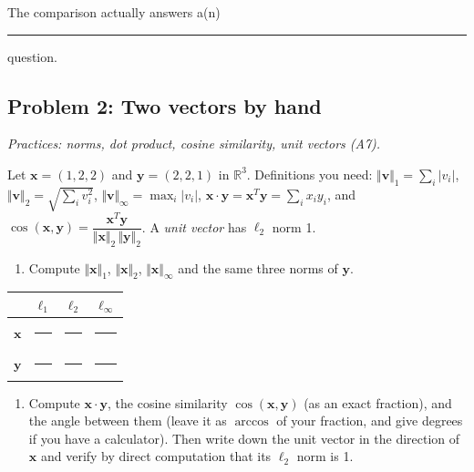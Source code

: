 \documentclass[
  11pt,
]{article}
\providecommand{\tightlist}{%
  \setlength{\itemsep}{0pt}\setlength{\parskip}{0pt}}
\newcommand{\answerspace}[1]{\par\vspace*{#1}}  %
\newcommand{\blank}[1][1.2in]{\rule{#1}{0.4pt}}
\newcommand{\answerpage}{\clearpage}
\begin{document}
The comparison actually answers a(n) \blank[1.6in] question.

\answerspace{1.6in}

\answerpage

\subsection{Problem 2: Two vectors by
hand}\label{problem-2-two-vectors-by-hand}

\emph{Practices: norms, dot product, cosine similarity, unit vectors
(A7).}

Let \(\mathbf{x} = (1, 2, 2)\) and \(\mathbf{y} = (2, 2, 1)\) in
\(\mathbb{R}^3\). Definitions you need:
\(\Vert\mathbf{v}\Vert_1 = \sum_i |v_i|\),
\(\Vert\mathbf{v}\Vert_2 = \sqrt{\sum_i v_i^2}\),
\(\Vert\mathbf{v}\Vert_\infty = \max_i |v_i|\),
\(\mathbf{x}\cdot\mathbf{y} = \mathbf{x}^T\mathbf{y} = \sum_i x_i y_i\),
and
\(\cos(\mathbf{x},\mathbf{y}) = \dfrac{\mathbf{x}^T\mathbf{y}}{\Vert\mathbf{x}\Vert_2\,\Vert\mathbf{y}\Vert_2}\).
A \emph{unit vector} has \(\ell_2\) norm 1.

\begin{enumerate}
\def\labelenumi{(\alph{enumi})}
\tightlist
\item
  Compute \(\Vert\mathbf{x}\Vert_1\), \(\Vert\mathbf{x}\Vert_2\),
  \(\Vert\mathbf{x}\Vert_\infty\) and the same three norms of
  \(\mathbf{y}\).
\end{enumerate}

\begin{longtable}[]{@{}cccc@{}}
\toprule\noalign{}
& \(\ell_1\) & \(\ell_2\) & \(\ell_\infty\) \\
\midrule\noalign{}
\endhead
\bottomrule\noalign{}
\endlastfoot
\(\mathbf{x}\) & \blank[0.8in] & \blank[0.8in] & \blank[0.8in] \\
\(\mathbf{y}\) & \blank[0.8in] & \blank[0.8in] & \blank[0.8in] \\
\end{longtable}

\answerspace{1.4in}

\begin{enumerate}
\def\labelenumi{(\alph{enumi})}
\setcounter{enumi}{1}
\tightlist
\item
  Compute \(\mathbf{x}\cdot\mathbf{y}\), the cosine similarity
  \(\cos(\mathbf{x},\mathbf{y})\) (as an exact fraction), and the angle
  between them (leave it as \(\arccos\) of your fraction, and give
  degrees if you have a calculator). Then write down the unit vector in
  the direction of \(\mathbf{x}\) and verify by direct computation that
  its \(\ell_2\) norm is 1.
\end{enumerate}
\end{document}
